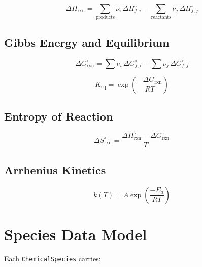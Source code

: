 \documentclass[11pt,a4paper]{article}
\begin{document}
\begin{equation}
    \Delta H_\text{rxn}^\circ
    = \sum_{\text{products}} \nu_i \, \Delta H_{f,i}^\circ
    - \sum_{\text{reactants}} \nu_j \, \Delta H_{f,j}^\circ
    \label{eq:hess}
\end{equation}

\subsection{Gibbs Energy and Equilibrium}

\begin{equation}
    \Delta G_\text{rxn}^\circ
    = \sum \nu_i \, \Delta G_{f,i}^\circ
    - \sum \nu_j \, \Delta G_{f,j}^\circ
\end{equation}

\begin{equation}
    K_\text{eq} = \exp\!\left(\frac{-\Delta G_\text{rxn}^\circ}{RT}\right)
    \label{eq:keq}
\end{equation}

\subsection{Entropy of Reaction}

\begin{equation}
    \Delta S_\text{rxn}^\circ
    = \frac{\Delta H_\text{rxn}^\circ - \Delta G_\text{rxn}^\circ}{T}
    \label{eq:entropy}
\end{equation}

\subsection{Arrhenius Kinetics}

\begin{equation}
    k(T) = A \exp\!\left(\frac{-E_a}{RT}\right)
    \label{eq:arrhenius}
\end{equation}

\section{Species Data Model}
\label{sec:species}

Each \texttt{ChemicalSpecies} carries:
\end{document}
